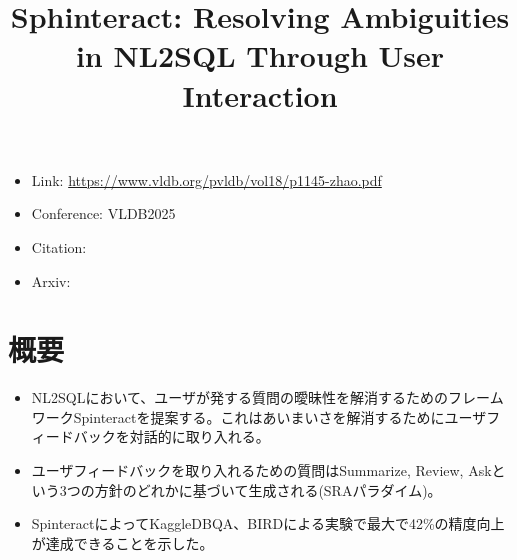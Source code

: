 \documentclass[dvipdfmx,uplatex]{jsarticle}
\title{Sphinteract: Resolving Ambiguities in NL2SQL Through User Interaction}
\author{\empty}
\date{\empty}
\theoremstyle{remark}
\newenvironment{simplebox}{
    \begin{tcolorbox}[
        fonttitle=\bfseries,
    ]
}{
    \end{tcolorbox}
}
\begin{document}
\maketitle

\begin{itemize}
    \item Link: \url{https://www.vldb.org/pvldb/vol18/p1145-zhao.pdf}
    \item Conference: VLDB2025
    \item Citation:
    \item Arxiv:
\end{itemize}

\section{概要}
\begin{simplebox}
\begin{itemize}
    \item NL2SQLにおいて、ユーザが発する質問の曖昧性を解消するためのフレームワークSpinteractを提案する。これはあいまいさを解消するためにユーザフィードバックを対話的に取り入れる。
    \item ユーザフィードバックを取り入れるための質問はSummarize, Review, Askという3つの方針のどれかに基づいて生成される(SRAパラダイム)。
    \item SpinteractによってKaggleDBQA、BIRDによる実験で最大で42\%の精度向上が達成できることを示した。
\end{itemize}
\end{simplebox}
\end{document}
